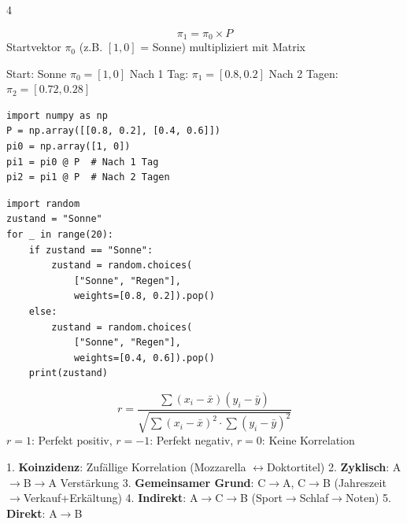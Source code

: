 \begin{landscape}
\begin{multicols*}{4}
		\begin{cheatSheetBox}[title=Vorhersage]
			\[
				\pi_1 = \pi_0 \times P
			\]
			Startvektor $\pi_0$ (z.B. $[1, 0]$ = Sonne) multipliziert mit Matrix
		\end{cheatSheetBox}

		\begin{cheatSheetBox}[title=Beispiel-Berechnung]
			Start: Sonne $\pi_0 = [1, 0]$
			Nach 1 Tag: $\pi_1 = [0.8, 0.2]$
			Nach 2 Tagen: $\pi_2 = [0.72, 0.28]$
		\end{cheatSheetBox}

		\begin{cheatSheetBox}[title=Python: Matrix und Vorhersage]
			\begin{lstlisting}
import numpy as np
P = np.array([[0.8, 0.2], [0.4, 0.6]])
pi0 = np.array([1, 0])
pi1 = pi0 @ P  # Nach 1 Tag
pi2 = pi1 @ P  # Nach 2 Tagen
			\end{lstlisting}
		\end{cheatSheetBox}

		\begin{cheatSheetBox}[title=Simulation mit Zufallszahlen]
			\begin{lstlisting}
import random
zustand = "Sonne"
for _ in range(20):
    if zustand == "Sonne":
        zustand = random.choices(
            ["Sonne", "Regen"],
            weights=[0.8, 0.2]).pop()
    else:
        zustand = random.choices(
            ["Sonne", "Regen"],
            weights=[0.4, 0.6]).pop()
    print(zustand)
			\end{lstlisting}
		\end{cheatSheetBox}


		\begin{cheatSheetBox}[title=Korrelationskoeffizient]
			\[
				r = \frac{\sum(x_i - \bar{x})(y_i - \bar{y})}{\sqrt{\sum(x_i - \bar{x})^2 \cdot \sum(y_i - \bar{y})^2}}
			\]
			$r=1$: Perfekt positiv, $r=-1$: Perfekt negativ, $r=0$: Keine Korrelation
		\end{cheatSheetBox}

		\begin{cheatSheetBox}[title=Fünf Arten von Kausalität]
			1. \textbf{Koinzidenz}: Zufällige Korrelation (Mozzarella $\leftrightarrow$Doktortitel)
			2. \textbf{Zyklisch}: A$\rightarrow$B$\rightarrow$A Verstärkung
			3. \textbf{Gemeinsamer Grund}: C$\rightarrow$A, C$\rightarrow$B (Jahreszeit$\rightarrow$Verkauf+Erkältung)
			4. \textbf{Indirekt}: A$\rightarrow$C$\rightarrow$B (Sport$\rightarrow$Schlaf$\rightarrow$Noten)
			5. \textbf{Direkt}: A$\rightarrow$B
		\end{cheatSheetBox}


\end{multicols*}
\end{landscape}

